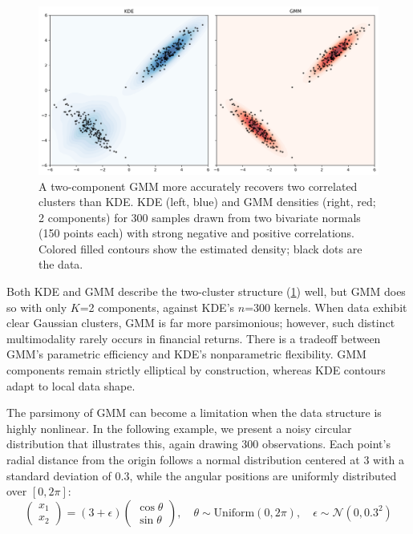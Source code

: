 \begin{figure}[H]
  \centering
  \includegraphics[width=\textwidth]{images/20_2.png}
  \caption[Best case scenario - GMM]{A two-component GMM more accurately recovers two correlated clusters than KDE. KDE (left, blue) and GMM densities (right, red; 2 components) for 300 samples drawn from two bivariate normals (150 points each) with strong negative and positive correlations. Colored filled contours show the estimated density; black dots are the data.}
  \label{fig:10_3}
\end{figure}

Both KDE and GMM describe the two-cluster structure (\ref{fig:10_3}) well, but GMM does so with only $K$=2 components, against KDE's $n$=300 kernels. When data exhibit clear Gaussian clusters, GMM is far more parsimonious; however, such distinct multimodality rarely occurs in financial returns. There is a tradeoff between GMM's parametric efficiency and KDE's nonparametric flexibility. GMM components remain strictly elliptical by construction, whereas KDE contours adapt to local data shape.

The parsimony of GMM can become a limitation when the data structure is highly nonlinear. In the following example, we present a noisy circular distribution that illustrates this, again drawing 300 observations. Each point's radial distance from the origin follows a normal distribution centered at $3$ with a standard deviation of $0.3$, while the angular positions are uniformly distributed over $[0, 2\pi]$:
$$\displaystyle (\begin{smallmatrix} x_1 \\ x_2 \end{smallmatrix}) = \left(3 + \epsilon\right) (\begin{smallmatrix} \cos\theta \\ \sin\theta \end{smallmatrix}), \quad \theta \sim \text{Uniform}(0, 2\pi), \quad \epsilon \sim \mathcal{N}(0, 0.3^2)$$

